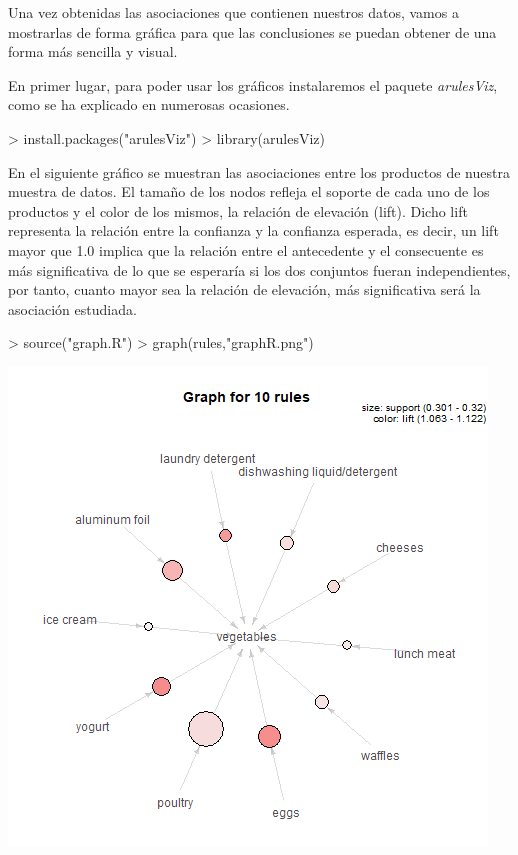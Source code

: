 \documentclass [a4paper] {article}
\begin{document}
{\bigskip
Una vez obtenidas las asociaciones que contienen nuestros datos, vamos a mostrarlas de forma gráfica para que las conclusiones
se puedan obtener de una forma más sencilla y visual.

\bigskip
En primer lugar, para poder usar los gráficos instalaremos el paquete \textit{arulesViz}, como se ha explicado en numerosas
ocasiones.
\begin{Schunk}
\begin{Sinput}
> install.packages("arulesViz")
> library(arulesViz)
\end{Sinput}
\end{Schunk}

\bigskip
En el siguiente gráfico se muestran las asociaciones entre los productos de nuestra muestra de datos. El tamaño de los nodos
refleja el soporte de cada uno de los productos y el color de los mismos, la relación de elevación (lift). Dicho lift representa 
la relación entre la confianza y la confianza esperada, es decir, un lift mayor que 1.0 implica que la relación entre el antecedente 
y el consecuente es más significativa de lo que se esperaría si los dos conjuntos fueran independientes, por tanto, cuanto mayor
sea la relación de elevación, más significativa será la asociación estudiada.
\begin{Schunk}
\begin{Sinput}
> source("graph.R")
> graph(rules,"graphR.png")
\end{Sinput}
\end{Schunk}
\includegraphics[width=\textwidth]{graphR}

}
\end{document}
